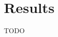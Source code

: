 \documentclass[fleqn,moreauthors,10pt]{ds_report}
\begin{document}


% 




\section*{Results}
TODO



\end{document}
